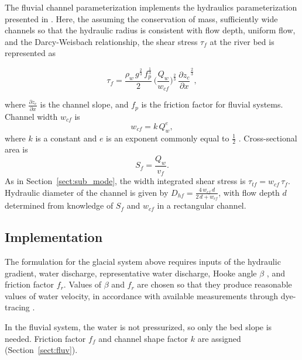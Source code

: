 \documentclass[11pt]{article}
\begin{document}
\begin{spacing}{1}
  The fluvial channel parameterization implements the hydraulics parameterization presented in \citet{tucker1997}.
  Here, the assuming the conservation of mass, sufficiently wide channels so that the hydraulic radius is consistent with flow depth, uniform flow, and the Darcy-Weisbach relationship,
  the shear stress $\tau_f$ at the river bed is represented as
  \begin{linenomath*}
    \begin{equation}
      \label{eq:DW_tau}
      \tau_f=\frac{\rho_w\,g^{\frac{2}{3}}\,f_p^{\frac{1}{3}}}{2}\, \Big(\frac{Q_w}{w_{cf}} \Big)^{\frac{2}{3}} \,\frac{\partial z_c}{\partial x}^{\frac{2}{3}},
    \end{equation}
  \end{linenomath*}
  where $\frac{\partial z_c}{\partial x}$ is the channel slope, and $f_p$ is the friction factor for fluvial systems.
  Channel width $w_{cf}$ is 
  \begin{equation}
    \label{eq:wcf}
    w_{cf} = k \, Q_w^e,
  \end{equation}
  where $k$ is a constant and $e$ is an exponent commonly equal to $\frac{1}{2}$ \citep{leopold1953}. Cross-sectional area is 
  \begin{equation}
    \label{eq:Sf}
    S_f= \frac{Q_w}{v_f}.
  \end{equation}
  As in Section~\ref{sect:sub_mode}, the width integrated shear stress is $\tau_{tf}=w_{cf}\,\tau_f$.
  Hydraulic diameter of the channel is given by $D_{hf} = \frac{4\,w_{cf}\,d}{2\,d+w_{cf}}$, with flow depth $d$ determined from knowledge of $S_f$ and $w_{cf}$ in a rectangular channel.
  
  \subsection{Implementation}
  
  The formulation for the glacial system above requires inputs of the hydraulic gradient, water discharge, representative water discharge, Hooke angle $\beta$ \citep{hooke1990}, and friction factor $f_r$.
  Values of $\beta$ and $f_r$ are chosen so that they produce reasonable values of water velocity, in accordance with available measurements through dye-tracing \citep[Section~\ref{sect:sub_mode}, Figure~\ref{fig:model_outs}; e.g.][]{werder2010}.
  
  In the fluvial system, the water is not pressurized, so only the bed slope is needed. Friction factor $f_f$ and channel shape factor $k$ are assigned (Section~\ref{sect:fluv}).
  

\end{spacing}
\end{document}
